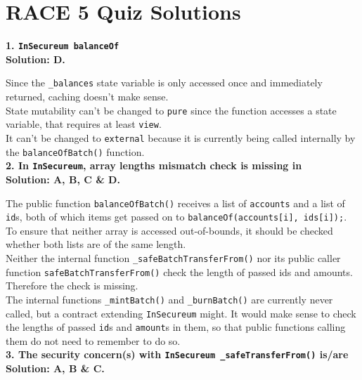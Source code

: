 \section{RACE 5 Quiz Solutions}

\textbf{1. \texttt{InSecureum balanceOf}}\label{sec:race5_q1}\\

\textbf{Solution: D.}

Since the \verb|_balances| state variable is only accessed once and immediately returned, caching doesn't make sense.\\

State mutability can't be changed to \verb|pure| since the function accesses a state variable, that requires at least \verb|view|.\\

It can't be changed to \verb|external| because it is currently being called internally by the \verb|balanceOfBatch()| function.\\

\textbf{2. In \texttt{InSecureum}, array lengths mismatch check is missing in}\label{sec:race5_q2}\\

\textbf{Solution: A, B, C \& D.}

The public function \verb|balanceOfBatch()| receives a list of \verb|accounts| and a list of \verb|id|s, both of which items get passed on to \verb|balanceOf(accounts[i], ids[i]);|.
To ensure that neither array is accessed out-of-bounds, it should be checked whether both lists are of the same length.\\

Neither the internal function \verb|_safeBatchTransferFrom()| nor its public caller function \verb|safeBatchTransferFrom()| check the length of passed ids and amounts.
Therefore the check is missing.\\

The internal functions \verb|_mintBatch()| and \verb|_burnBatch()| are currently never called, but a contract extending \verb|InSecureum| might.
It would make sense to check the lengths of passed \verb|id|s and \verb|amount|s in them, so that public functions calling them do not need to remember to do so.\\

\textbf{3. The security concern(s) with \texttt{InSecureum \_safeTransferFrom()} is/are}\label{sec:race5_q3}\\

\textbf{Solution: A, B \& C.}

